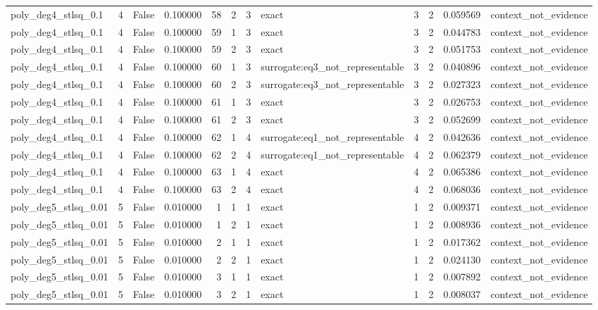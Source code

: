 \begin{tabular}{lrrrrrrlrrrl}
poly\_deg4\_stlsq\_0.1 & 4 & False & 0.100000 & 58 & 2 & 3 & exact & 3 & 2 & 0.059569 & context\_not\_evidence \\
poly\_deg4\_stlsq\_0.1 & 4 & False & 0.100000 & 59 & 1 & 3 & exact & 3 & 2 & 0.044783 & context\_not\_evidence \\
poly\_deg4\_stlsq\_0.1 & 4 & False & 0.100000 & 59 & 2 & 3 & exact & 3 & 2 & 0.051753 & context\_not\_evidence \\
poly\_deg4\_stlsq\_0.1 & 4 & False & 0.100000 & 60 & 1 & 3 & surrogate:eq3\_not\_representable & 3 & 2 & 0.040896 & context\_not\_evidence \\
poly\_deg4\_stlsq\_0.1 & 4 & False & 0.100000 & 60 & 2 & 3 & surrogate:eq3\_not\_representable & 3 & 2 & 0.027323 & context\_not\_evidence \\
poly\_deg4\_stlsq\_0.1 & 4 & False & 0.100000 & 61 & 1 & 3 & exact & 3 & 2 & 0.026753 & context\_not\_evidence \\
poly\_deg4\_stlsq\_0.1 & 4 & False & 0.100000 & 61 & 2 & 3 & exact & 3 & 2 & 0.052699 & context\_not\_evidence \\
poly\_deg4\_stlsq\_0.1 & 4 & False & 0.100000 & 62 & 1 & 4 & surrogate:eq1\_not\_representable & 4 & 2 & 0.042636 & context\_not\_evidence \\
poly\_deg4\_stlsq\_0.1 & 4 & False & 0.100000 & 62 & 2 & 4 & surrogate:eq1\_not\_representable & 4 & 2 & 0.062379 & context\_not\_evidence \\
poly\_deg4\_stlsq\_0.1 & 4 & False & 0.100000 & 63 & 1 & 4 & exact & 4 & 2 & 0.065386 & context\_not\_evidence \\
poly\_deg4\_stlsq\_0.1 & 4 & False & 0.100000 & 63 & 2 & 4 & exact & 4 & 2 & 0.068036 & context\_not\_evidence \\
poly\_deg5\_stlsq\_0.01 & 5 & False & 0.010000 & 1 & 1 & 1 & exact & 1 & 2 & 0.009371 & context\_not\_evidence \\
poly\_deg5\_stlsq\_0.01 & 5 & False & 0.010000 & 1 & 2 & 1 & exact & 1 & 2 & 0.008936 & context\_not\_evidence \\
poly\_deg5\_stlsq\_0.01 & 5 & False & 0.010000 & 2 & 1 & 1 & exact & 1 & 2 & 0.017362 & context\_not\_evidence \\
poly\_deg5\_stlsq\_0.01 & 5 & False & 0.010000 & 2 & 2 & 1 & exact & 1 & 2 & 0.024130 & context\_not\_evidence \\
poly\_deg5\_stlsq\_0.01 & 5 & False & 0.010000 & 3 & 1 & 1 & exact & 1 & 2 & 0.007892 & context\_not\_evidence \\
poly\_deg5\_stlsq\_0.01 & 5 & False & 0.010000 & 3 & 2 & 1 & exact & 1 & 2 & 0.008037 & context\_not\_evidence \\

\end{tabular}
